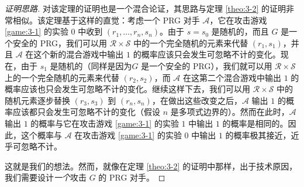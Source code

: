 \begin{proof}[证明思路]
对该定理的证明也是一个混合论证，其思路与定理 \ref{theo:3-2} 的证明非常相似。该定理基于这样的直觉：考虑一个 PRG 对手 $\mathcal A$，它在攻击游戏 \ref{game:3-1} 的实验 $0$ 中收到 $(r_1,\dots,r_n,s_n)$。由于 $s=s_0$ 是随机的，而且 $G$ 是一个安全的 PRG，我们可以用 $\mathcal{R}\times\mathcal{S}$ 中的一个完全随机的元素来代替 $(r_1,s_1)$，并且 $\mathcal A$ 在这个新的混合游戏中输出 $1$ 的概率应该只会发生可忽略不计的变化。现在，由于 $s_1$ 是随机的（同样是因为$G$ 是一个安全的 PRG），我们就可以用 $\mathcal{R}\times\mathcal{S}$ 上的一个完全随机的元素来代替 $(r_2,s_2)$，而 $\mathcal A$ 在这第二个混合游戏中输出 $1$ 的概率应该也只会发生可忽略不计的变化。继续这样下去，我们可以用 $\mathcal{R}\times\mathcal{S}$ 中的随机元素逐步替换 $(r_3,s_3)$ 到 $(r_n,s_n)$，在做出这些改变之后，$\mathcal A$ 输出 $1$ 的概率应该都只会发生可忽略不计的变化（假设 $n$ 是多项式边界的）。然而在此时，$\mathcal A$ 输出 $1$ 的概率与它在攻击游戏 \ref{game:3-1} 的实验 $1$ 中输出 $1$ 的概率是相同的。因此，这个概率与 $\mathcal A$ 在攻击游戏 \ref{game:3-1} 的实验 $0$ 中输出 $1$ 的概率极其接近，近乎可忽略不计。

这就是我们的想法。然而，就像在定理 \ref{theo:3-2} 的证明中那样，出于技术原因，我们需要设计\emph{一个}攻击 $G$ 的 PRG 对手。
\end{proof}

